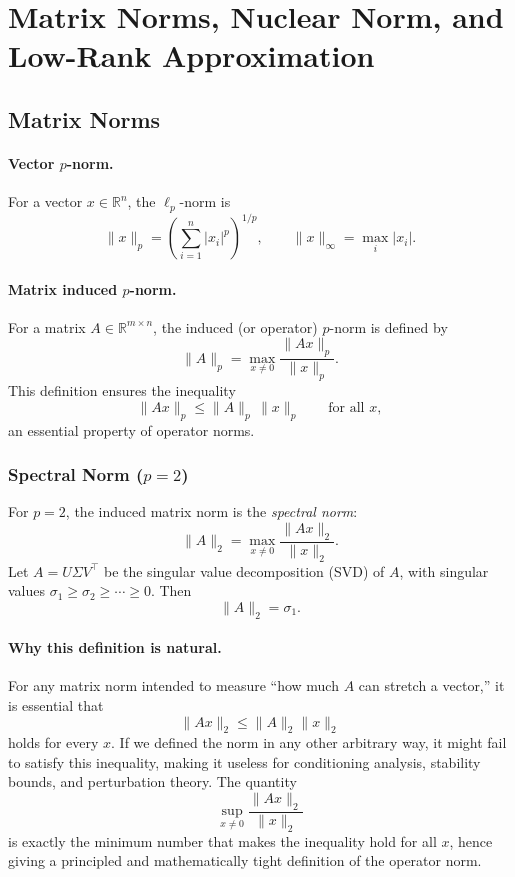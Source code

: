 \documentclass{article}
\begin{document}
\section{Matrix Norms, Nuclear Norm, and Low-Rank Approximation}

\subsection{Matrix Norms}

\paragraph{Vector $p$-norm.}
For a vector $x\in\mathbb{R}^n$, the $\ell_p$-norm is
\[
\|x\|_p = \left( \sum_{i=1}^n |x_i|^p \right)^{1/p}, \qquad
\|x\|_\infty = \max_i |x_i|.
\]

\paragraph{Matrix induced $p$-norm.}
For a matrix $A\in\mathbb{R}^{m\times n}$, the induced (or operator) $p$-norm is defined by
\[
\|A\|_p = \max_{x\neq 0} \frac{\|Ax\|_p}{\|x\|_p}.
\]
This definition ensures the inequality
\[
\|Ax\|_p \le \|A\|_p \, \|x\|_p \qquad \text{for all } x,
\]
an essential property of operator norms.

\subsubsection{Spectral Norm ($p=2$)}

For $p=2$, the induced matrix norm is the \emph{spectral norm}:
\[
\|A\|_2 = \max_{x\neq 0} \frac{\|Ax\|_2}{\|x\|_2}.
\]
Let $A=U\Sigma V^\top$ be the singular value decomposition (SVD) of $A$, with singular values
$\sigma_1 \ge \sigma_2 \ge \cdots \ge 0$. Then
\[
\|A\|_2 = \sigma_1.
\]

\paragraph{Why this definition is natural.}
For any matrix norm intended to measure ``how much $A$ can stretch a vector,'' it is essential that
\[
\|Ax\|_2 \le \|A\|_2\|x\|_2
\]
holds for every $x$.  
If we defined the norm in any other arbitrary way, it might fail to satisfy this inequality, making it useless for conditioning analysis, stability bounds, and perturbation theory.  
The quantity
\[
\sup_{x\neq 0} \frac{\|Ax\|_2}{\|x\|_2}
\]
is exactly the minimum number that makes the inequality hold for all $x$, hence giving a principled and mathematically tight definition of the operator norm.
\end{document}
